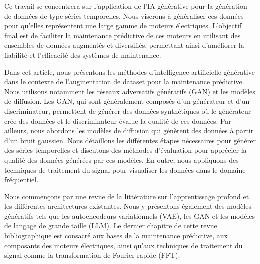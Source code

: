 \medskip
Ce travail se concentrera sur l'application de l'IA générative pour la génération de 
données de type séries temporelles. Nous viserons à généraliser ces données pour qu'elles
représentent une large gamme de moteurs électriques. L'objectif final est de faciliter la 
maintenance prédictive de ces moteurs en utilisant des ensembles de données augmentés et diversifiés, 
permettant ainsi d'améliorer la fiabilité et l'efficacité des systèmes de maintenance.








\medskip

Dans cet article, nous présentons les méthodes d'intelligence artificielle générative
dans le contexte de l'augmentation de dataset pour la maintenance prédictive. 
Nous utilisons notamment les réseaux adversatifs génératifs (GAN) et les modèles de diffusion.
Les GAN, qui sont généralement composés d'un générateur et d'un discriminateur, 
permettent de générer des données synthétiques où le générateur crée des données
et le discriminateur évalue la qualité de ces données. Par ailleurs,
nous abordons les modèles de diffusion qui génèrent des données à partir d'un bruit gaussien. Nous détaillons les différentes étapes nécessaires pour générer des séries temporelles et discutons des méthodes d'évaluation pour apprécier la qualité des données générées par ces modèles. En outre, 
nous appliquons des techniques de traitement du signal pour visualiser les données dans le domaine fréquentiel.

\medskip
Nous commençons par une revue de la littérature sur l'apprentissage profond et 
les différentes architectures existantes. Nous y présentons également des modèles 
génératifs tels que les autoencodeurs variationnels (VAE), les GAN et les modèles de 
langage de grande taille (LLM). Le dernier chapitre de cette revue bibliographique est 
consacré aux bases de la maintenance prédictive, aux composants des moteurs
électriques, ainsi qu'aux techniques de traitement du signal comme la transformation de 
Fourier rapide (FFT).



